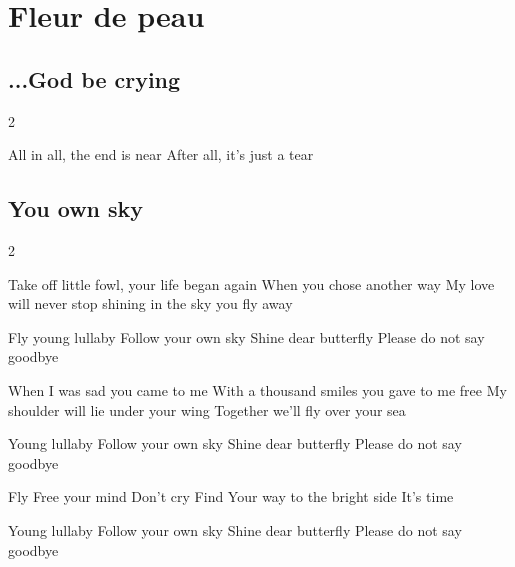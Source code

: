 \documentclass{article}
\newenvironment{album}[1]%
{%
  \section*{#1}
}%
{%
}
\newenvironment{song}[1]%
{%
  \subsection*{\textbf{#1}}
  \begin{multicols*}{2}
}%
{%
  \end{multicols*}
  \newpage
}
\newenvironment{couplet} %
{%
  \verbatim
}%
{% end code
  \endverbatim
}
\newenvironment{refrain} %
{%
  \verbatim
}%
{% end code
  \endverbatim
}
\newenvironment{pont} %
{%
  \verbatim
}%
{% end code
  \endverbatim
}
\begin{document}
\begin{album}{Fleur de peau}
\begin{song}{...God be crying}
\begin{refrain}
All in all, the end is near
After all, it’s just a tear
\end{refrain}
\end{song}


\begin{song}{You own sky}
\begin{couplet}
Take off little fowl, your life began again
When you chose another way
My love will never stop shining
in the sky you fly away
\end{couplet}
\begin{refrain}
Fly young lullaby
Follow your own sky
Shine dear butterfly
Please do not say goodbye  
\end{refrain}
\begin{couplet}
When I was sad you came to me
With a thousand smiles you gave to me free
My shoulder will lie under your wing
Together we’ll fly over your sea
\end{couplet}
\begin{refrain}
Young lullaby
Follow your own sky
Shine dear butterfly
Please do not say goodbye
\end{refrain}
\begin{pont}
Fly
Free your mind
Don’t cry
Find
Your way to the bright side
It’s time
\end{pont}
\begin{refrain}
Young lullaby
Follow your own sky
Shine dear butterfly
Please do not say goodbye
\end{refrain}

\end{song}

\end{album}
\end{document}

